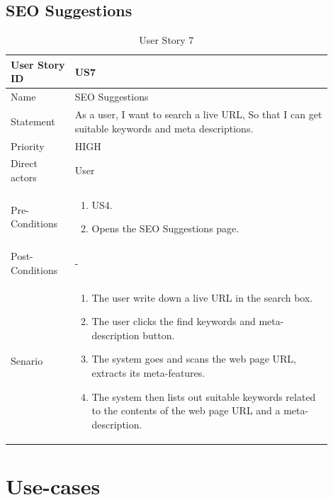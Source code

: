 \documentclass{scrartcl}
\begin{document}
\subsection{SEO Suggestions}

\begin{table}[H]
  \caption{User Story 7}
  \begin{tabular}{p{0.18\linewidth} | p{0.72\linewidth}}
    \toprule
    User Story ID & US7
    \\\midrule
    Name & SEO Suggestions
    \\\hline
    Statement & As a user, I want to search a live URL, So that I can get suitable keywords and meta descriptions.
    \\\hline
    Priority & HIGH
    \\\hline
    Direct actors & User
    \\\hline
    Pre-Conditions & {
                     \begin{enumerate}
                     \item US4.
                     \item Opens the SEO Suggestions page.
                     \end{enumerate}
                     }\vspace*{-\baselineskip}
    \\\hline
    Post-Conditions & -
    \\\hline
    Senario & {
              \begin{enumerate}
              \item The user write down a live URL in the search box.
              \item The user clicks the find keywords and meta-description button.
              \item The system goes and scans the web page URL, extracts its meta-features.
              \item The system then lists out suitable keywords related to the contents of the web page URL and a meta-description.
              \end{enumerate}
              }\vspace*{-\baselineskip}
    \\\bottomrule
  \end{tabular}
\end{table}

\section{Use-cases}
\end{document}
